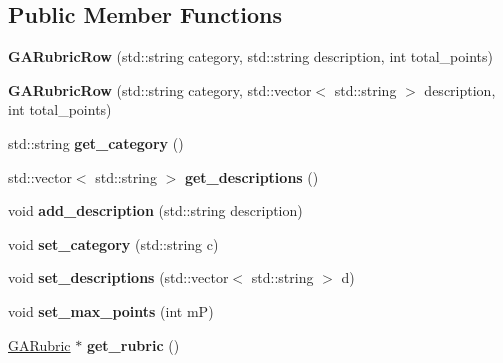 \subsection*{Public Member Functions}
\begin{DoxyCompactItemize}
\item 
\mbox{\label{class_g_a_rubric_row_ac537d4b51105cc03231b2940e8deb98a}} 
{\bfseries G\+A\+Rubric\+Row} (std\+::string category, std\+::string description, int total\+\_\+points)
\item 
\mbox{\label{class_g_a_rubric_row_a84bb1a3b310e8d286cccc236ef777233}} 
{\bfseries G\+A\+Rubric\+Row} (std\+::string category, std\+::vector$<$ std\+::string $>$ description, int total\+\_\+points)
\item 
\mbox{\label{class_g_a_rubric_row_a0c6ab85f38636783d154659ffa3eb7f1}} 
std\+::string {\bfseries get\+\_\+category} ()
\item 
\mbox{\label{class_g_a_rubric_row_ad264c5ea205fb67e79a799ea13acd243}} 
std\+::vector$<$ std\+::string $>$ {\bfseries get\+\_\+descriptions} ()
\item 
\mbox{\label{class_g_a_rubric_row_a3da02722bee23aeb6f406dad9fc7d91d}} 
void {\bfseries add\+\_\+description} (std\+::string description)
\item 
\mbox{\label{class_g_a_rubric_row_a9aff6802d32d7c5043a7258a4b75810e}} 
void {\bfseries set\+\_\+category} (std\+::string c)
\item 
\mbox{\label{class_g_a_rubric_row_a7a1a1b1dce57f75472dafe2cd3d13966}} 
void {\bfseries set\+\_\+descriptions} (std\+::vector$<$ std\+::string $>$ d)
\item 
\mbox{\label{class_g_a_rubric_row_a2a2b1b4538ce8e07b2be53d0c178e88c}} 
void {\bfseries set\+\_\+max\+\_\+points} (int mP)
\item 
\mbox{\label{class_g_a_rubric_row_ab8e196c8042240f8d181cecb34ccf473}} 
\hyperlink{class_g_a_rubric}{G\+A\+Rubric} $\ast$ {\bfseries get\+\_\+rubric} ()

\end{DoxyCompactItemize}
